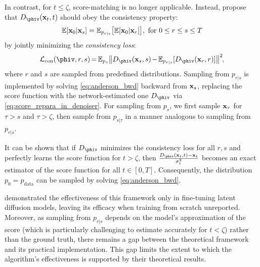 In contrast, for $t \leq \zeta$, score-matching is no longer applicable. Instead, \citet{DarasDD2024} propose that $D_{\phiv}(\xv_t, t)$ should obey the consistency property: %
\begin{align}
	\mathbb{E}[\mathbf{x}_0|\mathbf{x}_s] =  {\mathbb{E}}_{p_{r\vert s}} \big[\mathbb{E}[\mathbf{x}_0|\mathbf{x}_r] \big], \text{ for $0 \leq r \leq s \leq T$}
\end{align} 
by jointly minimizing the \textit{consistency loss}:
\begin{align}
	\Lc_\text{con}({\phiv}, r, s) \hspace{-0.12em}=\hspace{-0.12em} \Eb_{p_s} \big\|D_{\phiv}(\xv_s, s) \hspace{-0.12em} - \hspace{-0.12em} \Eb_{p_{r|s} } [D_{\phiv}(\xv_r, r)]  \big\|^2 \hspace{-0.12em}, \label{eq:consistency_loss}
\end{align}
where $r$ and $s$ are sampled from predefined distributions. Sampling from $p_{r|s}$ is implemented by solving \cref{eq:anderson_bwd} backward from $\mathbf{x}_s$, replacing the score function with the network-estimated one $D_{\phiv}$ via \cref{eq:score_repara_in_denoiser}. For sampling from $p_s$, we first sample $\mathbf{x}_\tau$ for $\tau > s$ and $\tau > \zeta$, then sample from $p_{s|\tau}$ in a manner analogous to sampling from $p_{r|s}$. 

It can be shown that if $D_{\phiv}$ minimizes the consistency loss for all $r, s$ and perfectly learns the score function for $t > \zeta$, then $\frac{D_{\phiv}(\xv_t, t) - \xv_t}{\sigma_t^2}$ becomes an exact estimator of the score function for all $t \in [0, T]$. Consequently, the distribution $p_0 = p_\text{data}$ can be sampled by solving \cref{eq:anderson_bwd}.

\citet{DarasDD2024} demonstrated the effectiveness of this framework only in fine-tuning latent diffusion models, leaving its efficacy when training from scratch unreported. Moreover, as sampling from $p_{r|s}$ depends on the model’s approximation of the score (which is particularly challenging to estimate accurately for $t < \zeta$) rather than the ground truth, there remains a gap between the theoretical framework and its practical implementation. This gap limits the extent to which the algorithm’s effectiveness is supported by their theoretical results.



